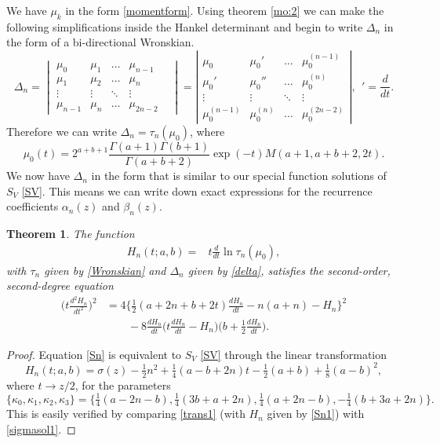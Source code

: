\documentclass[12pt]{article}
\newtheorem{mydef}{Theorem}[section]
\numberwithin{figure}{section}
\numberwithin{equation}{section}
\numberwithin{table}{section}
\begin{document}
We have $\mu_k$ in the form \eqref{momentform}. Using theorem \eqref{mo:2} we can make the following simplifications inside the Hankel
determinant and begin to write $\Delta_n$ in the form of a bi-directional Wronskian.
\[\Delta_n=
\begin{vmatrix}
\mu_{0} & \mu_1  &\hdots& \mu_{n-1} \\
\mu_1 & \mu_2 &\hdots& \mu_n  \\
\vdots &\vdots & \ddots &\vdots & \\
\mu_{n-1} & \mu_n &\hdots& \mu_{2n-2}
\end{vmatrix}
=\left|
\begin{array}{ccccc}
\mu_{0} & \mu_{0}'  &\hdots&  \mu_{0}^{(n-1)} \\
\mu_{0}' & \mu_{0}''  &\hdots&  \mu_{0}^{(n)}  \\
\vdots &\vdots  & \ddots &\vdots \\
\mu_{0}^{(n-1)} & \mu_{0}^{(n)}  &\hdots& \mu_{0}^{(2n-2)}
\end{array}
\right|,~~'=\frac{d}{dt}.\]
Therefore we can write $\Delta_n=\tau_n(\mu_0)$,
where
\begin{equation}\nonumber
\mu_0(t)=2^{ a+ b+1}\frac{\Gamma( a+1)\Gamma( b+1)}{\Gamma( a+ b+2)}\exp(-t)M( a+1, a+ b+2,2t).
\end{equation}
We now have $\Delta_n$ in the form that is similar to our special function solutions of $S_{V}$ \eqref{SV}. This means we can write down exact expressions for the recurrence coefficients $\alpha_n(z)$ and $\beta_n(z)$.
\begin{mydef}
The function
\begin{align}
H_n(t; a, b)=&t\frac{d}{dt}\ln \tau_n(\mu_0),\label{Sn1}
\end{align}
with $\tau_n$ given by \eqref{Wronskian} and $\Delta_n$ given by \eqref{delta}, satisfies the second-order, second-degree equation
\begin{align}\nonumber
\bigg(t\frac{d^2H_n}{dt^2}\bigg)^2&=4\bigg\{\frac{1}{2}(a+2n+b+2t)\frac{dH_n}{dt}
-n(a+n)-H_n\bigg\}^2\\
&\qquad-8\frac{dH_n}{dt}\bigg(t\frac{dH_n}{dt}-H_n\bigg)\bigg(b+\frac{1}{2}\frac{dH_n}{dt}\bigg).\label{Sn}
\end{align}
\end{mydef}
\begin{proof}
Equation \eqref{Sn} is equivalent to $S_V$ \eqref{SV} through the linear transformation
\begin{equation}
H_{{n}}(t; a, b)=\sigma(z)-\tfrac{1}{2}n^2+\tfrac{1}{4}(a-b+2n)t-\tfrac{1}{2}(a+b)+\tfrac{1}{8}(a-b)^2,\label{trans1}
\end{equation}
where $t\rightarrow z/2$, for the parameters
\begin{equation}
\{\kappa_0,\kappa_1,\kappa_2,\kappa_3\}=\{\tfrac{1}{4}( a-2n- b),\tfrac{1}{4}(3 b+ a+2n),\tfrac{1}{4}( a+2n- b),-\tfrac{1}{4}( b+
3 a+2n)\}.\label{para1}
\end{equation}
This is easily verified by comparing \eqref{trans1} (with $H_n$ given by \eqref{Sn1}) with \eqref{sigmasol1}.
\end{proof}
\end{document}
